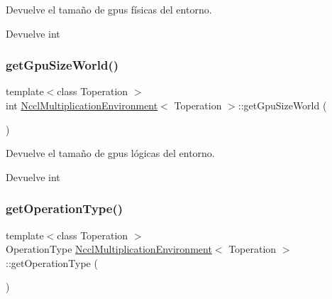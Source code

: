 Devuelve el tamaño de gpus físicas del entorno. 

\begin{DoxyReturn}{Devuelve}
int 
\end{DoxyReturn}
\mbox{\label{classNcclMultiplicationEnvironment_a2a7968831b4ef2c0fac08ab101d3f023}} 
\subsubsection{\texorpdfstring{get\+Gpu\+Size\+World()}{getGpuSizeWorld()}}
{\footnotesize\ttfamily template$<$class Toperation $>$ \\
int \hyperlink{classNcclMultiplicationEnvironment}{Nccl\+Multiplication\+Environment}$<$ Toperation $>$\+::get\+Gpu\+Size\+World (\begin{DoxyParamCaption}{ }\end{DoxyParamCaption})}



Devuelve el tamaño de gpus lógicas del entorno. 

\begin{DoxyReturn}{Devuelve}
int 
\end{DoxyReturn}
\mbox{\label{classNcclMultiplicationEnvironment_a1300d297a3d36bfcfed004f31cfc7ac4}} 
\subsubsection{\texorpdfstring{get\+Operation\+Type()}{getOperationType()}}
{\footnotesize\ttfamily template$<$class Toperation $>$ \\
Operation\+Type \hyperlink{classNcclMultiplicationEnvironment}{Nccl\+Multiplication\+Environment}$<$ Toperation $>$\+::get\+Operation\+Type (\begin{DoxyParamCaption}{ }\end{DoxyParamCaption})}



